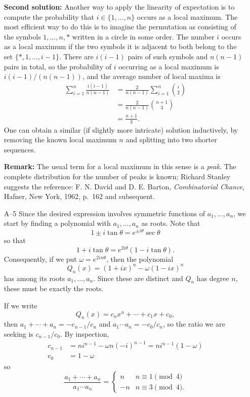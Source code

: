 \documentclass[amssymb,twocolumn,pra,10pt,aps]{revtex4-1}
\begin{document}
\begin{itemize}
\textbf{Second solution:}
Another way to apply the linearity of expectation is to compute the
probability that $i \in \{1, \dots, n\}$ occurs as a local maximum.
The most efficient way to do this is to imagine the permutation
as consisting of the symbols $1, \dots, n, *$ written in a circle in
some order. The number $i$ occurs as a local maximum if the two symbols
it is adjacent to both belong to the set $\{*, 1, \dots, i-1\}$. There are
$i(i-1)$ pairs of such symbols and $n(n-1)$ pairs in total, so the
probability of $i$ occurring as a local maximum is $i(i-1)/(n(n-1))$, and
the average number of local maxima is
\begin{align*}
\sum_{i=1}^n \frac{i(i-1)}{n(n-1)} &=
\frac{2}{n(n-1)} \sum_{i=1}^n \binom{i}{2} \\
&= \frac{2}{n(n-1)} \binom{n+1}{3} \\
&= \frac{n+1}{3}.
\end{align*}
One can obtain a similar (if slightly more intricate)
solution inductively, by removing the known
local maximum $n$ and splitting into two shorter sequences.

\textbf{Remark:}
The usual term for a local maximum in this sense is a \emph{peak}.
The complete distribution for the number of peaks is known;
Richard Stanley suggests the reference:
F. N. David and D. E. Barton, \textit{Combinatorial Chance}, Hafner, New York,
1962, p.\ 162 and subsequent.

\item[A--5]
Since the desired expression involves symmetric functions of $a_1,
\dots, a_n$, we start by finding a polynomial with $a_1, \dots, a_n$
as roots. Note that
\[
1 \pm i \tan \theta = e^{\pm i \theta} \sec \theta
\]
so that
\[
1 + i \tan \theta = e^{2 i \theta} (1 - i \tan \theta).
\]
Consequently, if we put $\omega = e^{2 i n \theta}$, then the polynomial
\[
Q_n(x) = (1 + ix)^n - \omega (1-ix)^n
\]
has among its roots $a_1, \dots, a_n$. Since these are distinct and
$Q_n$ has degree $n$, these must be exactly the roots.

If we write
\[
Q_n(x) = c_n x^n + \cdots + c_1 x + c_0,
\]
then $a_1 + \cdots + a_n = -c_{n-1}/c_n$ and $a_1\cdots a_n = -c_0/c_n$,
so the ratio we are seeking is $c_{n-1}/c_0$.
By inspection,
\begin{align*}
c_{n-1} &= n i^{n-1} - \omega n (-i)^{n-1} = n i^{n-1} (1-\omega)\\
c_0 &= 1 - \omega
\end{align*}
so
\[
\frac{a_1+ \cdots + a_n}{a_1 \cdots a_n}
= \begin{cases} n & n \equiv 1 \pmod{4} \\ -n & n \equiv 3 \pmod{4}.
\end{cases}
\]


\end{itemize}
\end{document}
